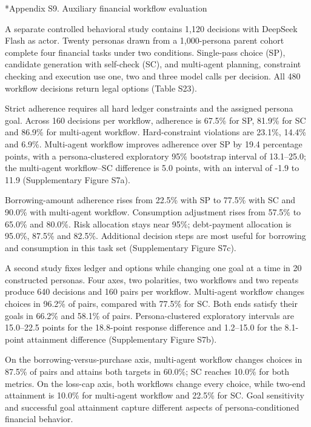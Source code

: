 \documentclass[10pt]{article}
\makeatletter
\renewcommand\section{\@startsection{section}{1}{\z@}{-2.2ex plus -1ex minus -.2ex}{.9ex plus .2ex}{\normalfont\large\mdseries}}
\makeatother
\begin{document}
\section*{Appendix S9. Auxiliary financial workflow evaluation}

A separate controlled behavioral study contains 1,120 decisions with DeepSeek Flash as actor. Twenty personas drawn from a 1,000-persona parent cohort complete four financial tasks under two conditions. Single-pass choice (SP), candidate generation with self-check (SC), and multi-agent planning, constraint checking and execution use one, two and three model calls per decision. All 480 workflow decisions return legal options (Table S23).

Strict adherence requires all hard ledger constraints and the assigned persona goal. Across 160 decisions per workflow, adherence is 67.5\% for SP, 81.9\% for SC and 86.9\% for multi-agent workflow. Hard-constraint violations are 23.1\%, 14.4\% and 6.9\%. Multi-agent workflow improves adherence over SP by 19.4 percentage points, with a persona-clustered exploratory 95\% bootstrap interval of 13.1–25.0; the multi-agent workflow–SC difference is 5.0 points, with an interval of -1.9 to 11.9 (Supplementary Figure S7a).

Borrowing-amount adherence rises from 22.5\% with SP to 77.5\% with SC and 90.0\% with multi-agent workflow. Consumption adjustment rises from 57.5\% to 65.0\% and 80.0\%. Risk allocation stays near 95\%; debt-payment allocation is 95.0\%, 87.5\% and 82.5\%. Additional decision steps are most useful for borrowing and consumption in this task set (Supplementary Figure S7c).

A second study fixes ledger and options while changing one goal at a time in 20 constructed personas. Four axes, two polarities, two workflows and two repeats produce 640 decisions and 160 pairs per workflow. Multi-agent workflow changes choices in 96.2\% of pairs, compared with 77.5\% for SC. Both ends satisfy their goals in 66.2\% and 58.1\% of pairs. Persona-clustered exploratory intervals are 15.0–22.5 points for the 18.8-point response difference and 1.2–15.0 for the 8.1-point attainment difference (Supplementary Figure S7b).

On the borrowing-versus-purchase axis, multi-agent workflow changes choices in 87.5\% of pairs and attains both targets in 60.0\%; SC reaches 10.0\% for both metrics. On the loss-cap axis, both workflows change every choice, while two-end attainment is 10.0\% for multi-agent workflow and 22.5\% for SC. Goal sensitivity and successful goal attainment capture different aspects of persona-conditioned financial behavior.
\end{document}
